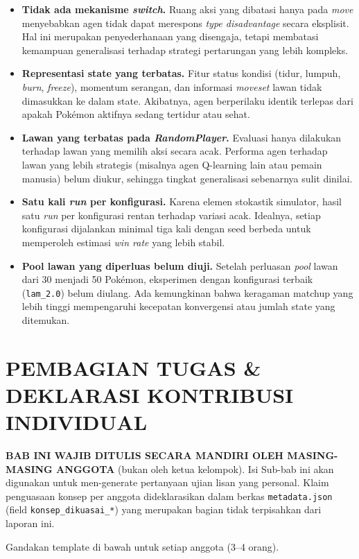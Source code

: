 \documentclass[11pt,a4paper,oneside]{report}
\begin{document}
\begin{itemize}[leftmargin=*]
    \item \textbf{Tidak ada mekanisme \textit{switch}.} Ruang aksi yang dibatasi hanya pada \textit{move} menyebabkan agen tidak dapat merespons \textit{type disadvantage} secara eksplisit. Hal ini merupakan penyederhanaan yang disengaja, tetapi membatasi kemampuan generalisasi terhadap strategi pertarungan yang lebih kompleks.
    \item \textbf{Representasi state yang terbatas.} Fitur status kondisi (tidur, lumpuh, \textit{burn}, \textit{freeze}), momentum serangan, dan informasi \textit{moveset} lawan tidak dimasukkan ke dalam state. Akibatnya, agen berperilaku identik terlepas dari apakah Pokémon aktifnya sedang tertidur atau sehat.
    \item \textbf{Lawan yang terbatas pada \textit{RandomPlayer}.} Evaluasi hanya dilakukan terhadap lawan yang memilih aksi secara acak. Performa agen terhadap lawan yang lebih strategis (misalnya agen Q-learning lain atau pemain manusia) belum diukur, sehingga tingkat generalisasi sebenarnya sulit dinilai.
    \item \textbf{Satu kali \textit{run} per konfigurasi.} Karena elemen stokastik simulator, hasil satu \textit{run} per konfigurasi rentan terhadap variasi acak. Idealnya, setiap konfigurasi dijalankan minimal tiga kali dengan seed berbeda untuk memperoleh estimasi \textit{win rate} yang lebih stabil.
    \item \textbf{Pool lawan yang diperluas belum diuji.} Setelah perluasan \textit{pool} lawan dari 30 menjadi 50 Pokémon, eksperimen dengan konfigurasi terbaik (\texttt{lam\_2.0}) belum diulang. Ada kemungkinan bahwa keragaman matchup yang lebih tinggi mempengaruhi kecepatan konvergensi atau jumlah state yang ditemukan.
\end{itemize}

\chapter{PEMBAGIAN TUGAS \& DEKLARASI KONTRIBUSI INDIVIDUAL}
\label{bab:kontribusi}

\begin{petunjuk}
\textbf{BAB INI WAJIB DITULIS SECARA MANDIRI OLEH MASING-MASING ANGGOTA} (bukan oleh ketua kelompok). Isi Sub-bab ini akan digunakan untuk men-generate pertanyaan ujian lisan yang personal. Klaim penguasaan konsep per anggota dideklarasikan dalam berkas \texttt{metadata.json} (field \texttt{konsep\_dikuasai\_*}) yang merupakan bagian tidak terpisahkan dari laporan ini.

Gandakan template di bawah untuk setiap anggota (3--4 orang).
\end{petunjuk}
\end{document}
